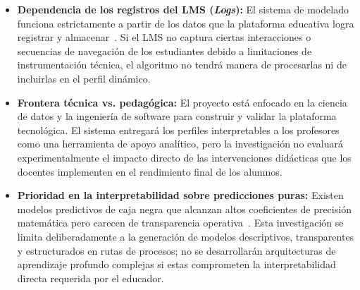 \begin{itemize}
    \item \textbf{Dependencia de los registros del LMS (\textit{Logs}):} El sistema de modelado funciona estrictamente a partir de los datos que la plataforma educativa logra registrar y almacenar~\cite{Setiadi2025}. Si el LMS no captura ciertas interacciones o secuencias de navegación de los estudiantes debido a limitaciones de instrumentación técnica, el algoritmo no tendrá manera de procesarlas ni de incluirlas en el perfil dinámico.
    \item \textbf{Frontera técnica vs. pedagógica:} El proyecto está enfocado en la ciencia de datos y la ingeniería de software para construir y validar la plataforma tecnológica. El sistema entregará los perfiles interpretables a los profesores como una herramienta de apoyo analítico, pero la investigación no evaluará experimentalmente el impacto directo de las intervenciones didácticas que los docentes implementen en el rendimiento final de los alumnos.
    \item \textbf{Prioridad en la interpretabilidad sobre predicciones puras:} Existen modelos predictivos de caja negra que alcanzan altos coeficientes de precisión matemática pero carecen de transparencia operativa~\cite{BarredoArrieta2020,Lee2025}. Esta investigación se limita deliberadamente a la generación de modelos descriptivos, transparentes y estructurados en rutas de procesos; no se desarrollarán arquitecturas de aprendizaje profundo complejas si estas comprometen la interpretabilidad directa requerida por el educador.
\end{itemize}